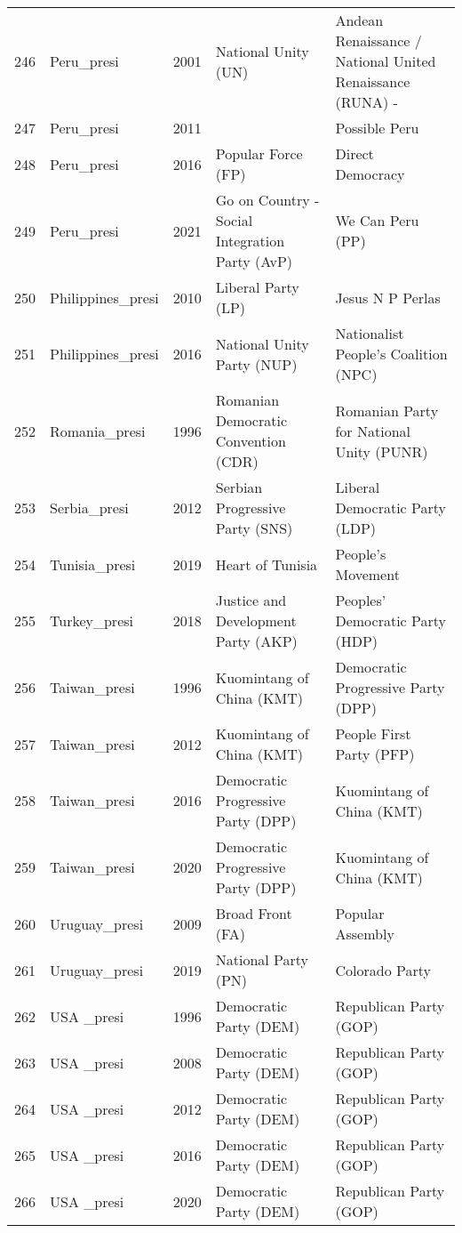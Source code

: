 \documentclass[12pt]{article}
\begin{document}
\begin{table}[ht]
\begin{footnotesize}
\begin{tabular}{rllll}
  246 & Peru\_presi & 2001 &   National Unity (UN) &   Andean Renaissance / National United Renaissance (RUNA) - \\ 
  247 & Peru\_presi & 2011 &  &   Possible Peru \\ 
  248 & Peru\_presi & 2016 &   Popular Force (FP) &   Direct Democracy \\ 
  249 & Peru\_presi & 2021 &   Go on Country - Social Integration Party (AvP) &   We Can Peru (PP) \\ 
  250 & Philippines\_presi & 2010 &   Liberal Party (LP) &   Jesus N P Perlas \\ 
  251 & Philippines\_presi & 2016 &   National Unity Party (NUP) &   Nationalist People's Coalition (NPC) \\ 
  252 & Romania\_presi & 1996 &   Romanian Democratic Convention (CDR) &   Romanian Party for National Unity (PUNR) \\ 
  253 & Serbia\_presi & 2012 &   Serbian Progressive Party (SNS) &   Liberal Democratic Party (LDP) \\ 
  254 & Tunisia\_presi & 2019 &   Heart of Tunisia &   People's Movement \\ 
  255 & Turkey\_presi & 2018 &   Justice and Development Party (AKP) &   Peoples' Democratic Party (HDP) \\ 
  256 & Taiwan\_presi & 1996 &   Kuomintang of China (KMT)  &   Democratic Progressive Party (DPP) \\ 
  257 & Taiwan\_presi & 2012 &   Kuomintang of China (KMT)  &   People First Party (PFP) \\ 
  258 & Taiwan\_presi & 2016 &   Democratic Progressive Party (DPP) &   Kuomintang of China (KMT)  \\ 
  259 & Taiwan\_presi & 2020 &   Democratic Progressive Party (DPP) &   Kuomintang of China (KMT)  \\ 
  260 & Uruguay\_presi & 2009 &   Broad Front (FA) &   Popular Assembly \\ 
  261 & Uruguay\_presi & 2019 &   National Party (PN) &   Colorado Party \\ 
  262 &  USA \_presi & 1996 &   Democratic Party (DEM) &   Republican Party (GOP) \\ 
  263 &  USA \_presi & 2008 &   Democratic Party (DEM) &   Republican Party (GOP) \\ 
  264 &  USA \_presi & 2012 &   Democratic Party (DEM) &   Republican Party (GOP) \\ 
  265 &  USA \_presi & 2016 &   Democratic Party (DEM) &   Republican Party (GOP) \\ 
  266 &  USA \_presi & 2020 &   Democratic Party (DEM) &   Republican Party (GOP) \\ 
   \hline
\end{tabular}
   \end{footnotesize}
\end{table}
\end{document}
